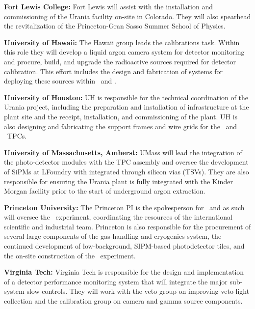 {\bf Fort Lewis College:} Fort Lewis will assist with the installation and commissioning of the Urania facility on-site in Colorado. They will also spearhead the revitalization of the Princeton-Gran Sasso Summer School of Physics.

{\bf University of Hawaii:} The Hawaii group leads the calibrations task. Within this role they will develop a liquid argon camera system for detector monitoring and procure, build, and upgrade the radioactive sources required for detector calibration. This effort includes the design and fabrication of systems for deploying these sources within \DSps\ and \DSks.

{\bf University of Houston:} UH is responsible for the technical coordination of the Urania project, including the preparation and installation of infrastructure at the plant site and the receipt, installation, and commissioning of the plant. UH is also designing and fabricating the support frames and wire grids for the \DSps\ and \DSks\ TPCs.

{\bf University of Massachusetts, Amherst:} UMass will lead the integration of the photo-detector modules with the TPC assembly and oversee the development of SiPMs at LFoundry with integrated through silicon vias (TSVs). They are also responsible for ensuring the Urania plant is fully integrated with the Kinder Morgan facility prior to the start of underground argon extraction.

{\bf Princeton University:} The Princeton PI is the spokesperson for \DS\ and as such will oversee the \DSks\ experiment, coordinating the resources of the international scientific and industrial team. Princeton is also responsible for the procurement of several large components of the gas-handling and cryogenics system, the continued development of low-background, SIPM-based photodetector tiles, and the on-site construction of the \DSks\ experiment.

{\bf Virginia Tech:} Virginia Tech is responsible for the design and implementation of a detector performance monitoring system that will integrate the major sub-system slow controls. They will work with the veto group on improving veto light collection and the calibration group on camera and gamma source components.

